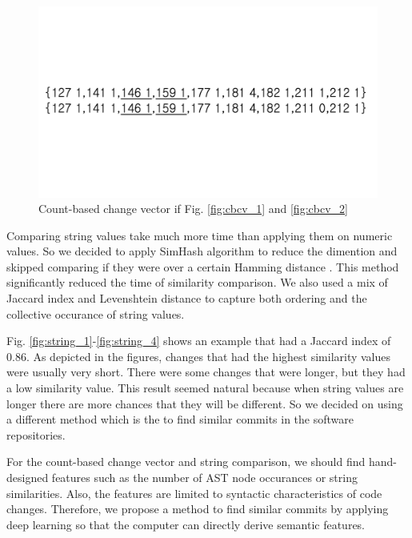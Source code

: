\begin{figure}[!ht]
    \renewcommand{\arraystretch}{1}
    \centering
    \includegraphics[width=\linewidth]{figures/cbcv-3.pdf}\hfill
    \caption{Count-based change vector if Fig. \ref{fig:cbcv_1} and \ref{fig:cbcv_2}}
    \label{fig:cbcv_3}
\end{figure}


Comparing string values take much more time than applying them on numeric values. 
So we decided to apply SimHash algorithm to reduce the dimention and skipped comparing if they were over a certain Hamming distance \cite{uddin2011effectiveness}.
This method significantly reduced the time of similarity comparison.
We also used a mix of Jaccard index and Levenshtein distance to capture both ordering and the collective occurance of string values. 

Fig. \ref{fig:string_1}-\ref{fig:string_4} shows an example that had a Jaccard index of 0.86. 
As depicted in the figures, changes that had the highest similarity values were usually very short. 
There were some changes that were longer, but they had a low similarity value.
This result seemed natural because when string values are longer there are more chances that they will be different.
So we decided on using a different method which is the {\simfin} to find similar commits in the software repositories.

For the count-based change vector and string comparison, we should find hand-designed features such as the number of AST node occurances or string similarities.
Also, the features are limited to syntactic characteristics of code changes.
Therefore, we propose a method to find similar commits by applying deep learning so that the computer can directly derive semantic features.

